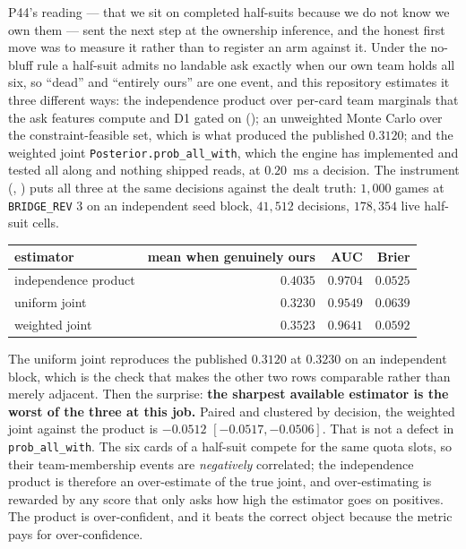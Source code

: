 \documentclass[11pt,letterpaper]{article}
\begin{document}
P44's reading --- that we sit on completed half-suits because we do not know
we own them --- sent the next step at the ownership inference, and the honest
first move was to measure it rather than to register an arm against it. Under
the no-bluff rule a half-suit admits no landable ask exactly when our own team
holds all six, so ``dead'' and ``entirely ours'' are one event, and this
repository estimates it three different ways: the independence product over
per-card team marginals that the ask features compute and D1 gated on
(); an unweighted Monte Carlo over the
constraint-feasible set, which is what produced the published $0.3120$; and the
weighted joint \texttt{Posterior.prob\_all\_with}, which the engine has
implemented and tested all along and nothing shipped reads, at $0.20$~ms a
decision. The instrument
(, )
puts all three at the same decisions against the dealt truth: $1{,}000$ games
at \texttt{BRIDGE\_REV} 3 on an independent seed block, $41{,}512$ decisions,
$178{,}354$ live half-suit cells.

\begin{center}
\small
\begin{tabular}{lrrr}
\toprule
estimator & mean when genuinely ours & AUC & Brier \\
\midrule
independence product & $\mathbf{0.4035}$ & $\mathbf{0.9704}$ & $\mathbf{0.0525}$ \\
uniform joint & $0.3230$ & $0.9549$ & $0.0639$ \\
weighted joint & $0.3523$ & $0.9641$ & $0.0592$ \\
\bottomrule
\end{tabular}
\end{center}

\noindent The uniform joint reproduces the published $0.3120$ at $0.3230$ on
an independent block, which is the check that makes the other two rows
comparable rather than merely adjacent. Then the surprise: \textbf{the sharpest
available estimator is the worst of the three at this job.} Paired and clustered
by decision, the weighted joint against the product is
$\mathbf{-0.0512}$ $[-0.0517, -0.0506]$. That is not a defect in
\texttt{prob\_all\_with}. The six
cards of a half-suit compete for the same quota slots, so their team-membership
events are \emph{negatively} correlated; the independence product is therefore
an over-estimate of the true joint, and over-estimating is rewarded by any score
that only asks how high the estimator goes on positives. The product is
over-confident, and it beats the correct object because the metric pays for
over-confidence.
\end{document}
